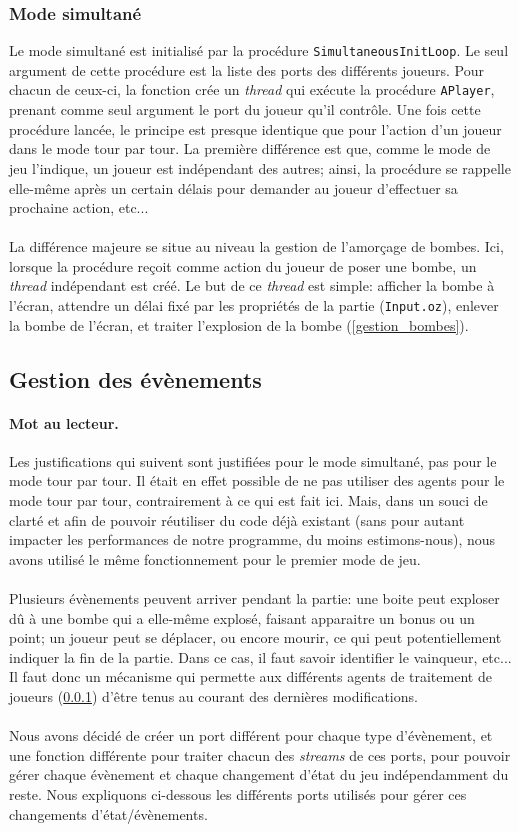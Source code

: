 \documentclass{article}
\begin{document}
\subsubsection{Mode simultané}
\label{simult}
Le mode simultané est initialisé par la procédure \texttt{SimultaneousInitLoop}. Le seul argument de cette procédure est la liste des ports des différents joueurs. Pour chacun de ceux-ci, la fonction crée un \emph{thread} qui exécute la procédure \texttt{APlayer}, prenant comme seul argument le port du joueur qu'il contrôle. Une fois cette procédure lancée, le principe est presque identique que pour l'action d'un joueur dans le mode tour par tour. La première différence est que, comme le mode de jeu l'indique, un joueur est indépendant des autres; ainsi, la procédure se rappelle elle-même après un certain délais pour demander au joueur d'effectuer sa prochaine action, etc... \\ \\
La différence majeure se situe au niveau la gestion de l'amorçage de bombes. Ici, lorsque la procédure reçoit comme action du joueur de poser une bombe, un \emph{thread} indépendant est créé. Le but de ce \emph{thread} est simple: afficher la bombe à l'écran, attendre un délai fixé par les propriétés de la partie (\texttt{Input.oz}), enlever la bombe de l'écran, et traiter l'explosion de la bombe (\ref{gestion_bombes}).

\subsection{Gestion des évènements}
\paragraph{Mot au lecteur.}Les justifications qui suivent sont justifiées pour le mode simultané, pas pour le mode tour par tour. Il était en effet possible de ne pas utiliser des agents pour le mode tour par tour, contrairement à ce qui est fait ici. Mais, dans un souci de clarté et afin de pouvoir réutiliser du code déjà existant (sans pour autant impacter les performances de notre programme, du moins estimons-nous), nous avons utilisé le même fonctionnement pour le premier mode de jeu. \\ \\
Plusieurs évènements peuvent arriver pendant la partie: une boite peut exploser dû à une bombe qui a elle-même explosé, faisant apparaitre un bonus ou un point; un joueur peut se déplacer, ou encore mourir, ce qui peut potentiellement indiquer la fin de la partie. Dans ce cas, il faut savoir identifier le vainqueur, etc... Il faut donc un mécanisme qui permette aux différents agents de traitement de joueurs (\ref{simult}) d'être tenus au courant des dernières modifications. \\ \\
Nous avons décidé de créer un port différent pour chaque type d'évènement, et une fonction différente pour traiter chacun des \emph{streams} de ces ports, pour pouvoir gérer chaque évènement et chaque changement d'état du jeu indépendamment du reste. Nous expliquons ci-dessous les différents ports utilisés pour gérer ces changements d'état/évènements.
\end{document}

